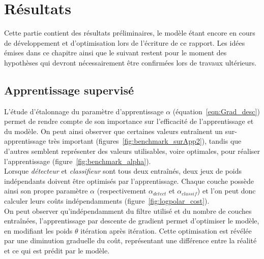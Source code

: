
\chapter{Résultats} %
 
\label{Résultats} %


Cette partie contient des résultats préliminaires, le modèle étant encore en cours de développement et d'optimisation lors de l'écriture de ce rapport. Les idées émises dans ce chapitre ainsi que le suivant restent pour le moment des hypothèses qui devront nécessairement être confirmées lors de travaux ultérieurs. \\

\section{Apprentissage supervisé}

L'étude d'étalonnage du paramètre d'apprentissage $\alpha$ (équation~\ref{eqn:Grad_desc}) permet de rendre compte de son importance sur l'efficacité de l'apprentissage et du modèle. On peut ainsi observer que certaines valeurs entraînent un sur-apprentissage très important (figures~\ref{fig:benchmark_surApp2}), tandis que d'autres semblent représenter des valeurs utilisables, voire optimales, pour réaliser l'apprentissage (figure~\ref{fig:benchmark_alpha}).\\
Lorsque \textit{détecteur} et \textit{classifieur} sont tous deux entraînés, deux jeux de poids indépendants doivent être optimisés par l'apprentissage. Chaque couche possède ainsi son propre paramètre $\alpha$ (respectivement $\alpha_{detect}$ et $\alpha_{classif}$) et l'on peut donc calculer leurs coûts indépendamments (figure~\ref{fig:logpolar_cost}).\\
On peut observer qu'indépendamment du filtre utilisé et du nombre de couches entraînées, l'apprentissage par descente de gradient permet d'optimiser le modèle, en modifiant les poids $\theta$ itération après itération. Cette optimisation est révélée par une diminution graduelle du coût, représentant une différence entre la réalité et ce qui est prédit par le modèle.


